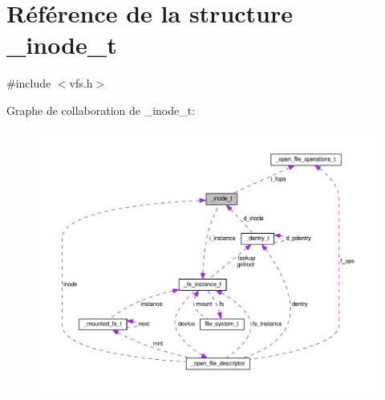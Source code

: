 \hypertarget{struct__inode__t}{\section{Référence de la structure \+\_\+inode\+\_\+t}
\label{struct__inode__t}
}


{\ttfamily \#include $<$vfs.\+h$>$}



Graphe de collaboration de \+\_\+inode\+\_\+t\+:
\nopagebreak
\begin{figure}[H]
\begin{center}
\leavevmode
\includegraphics[width=350pt]{struct__inode__t__coll__graph}
\end{center}
\end{figure}
